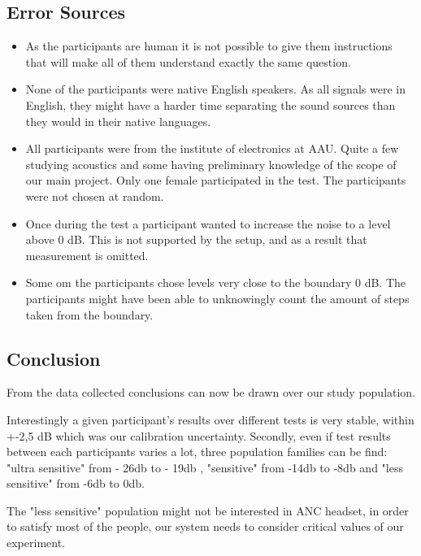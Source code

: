 \subsection{Error Sources}
\begin{itemize}
\item As the participants are human it is not possible to give them instructions that will make all of them understand exactly the same question. 
\item None of the participants were native English speakers. As all signals were in English, they might have a harder time separating the sound sources than they would in their native languages. 
\item All participants were from the institute of electronics at AAU. Quite a few studying acoustics and some having preliminary knowledge of the scope of our main project. Only one female participated in the test. The participants were not chosen at random.  
\item Once during the test a participant wanted to increase the noise to a level above 0 dB. This is not supported by the setup, and as a result that measurement is omitted.
\item Some om the participants chose levels very close to the boundary 0 dB. The participants might have been able to unknowingly count the amount of steps taken from the boundary.  
\end{itemize}

\subsection{Conclusion}
From the data collected conclusions can now be drawn over our study population. 

Interestingly a given participant's results over different tests is very stable, within +-2,5 dB which was our calibration uncertainty.  Secondly, even if test results between each participants varies a lot, three population families can be find: "ultra sensitive" from - 26db to - 19db , "sensitive" from -14db to -8db  and "less sensitive" from -6db to 0db. 

The "less sensitive" population might not be interested in ANC headset, in order to satisfy most of the people, our system needs to consider critical values of our experiment.





